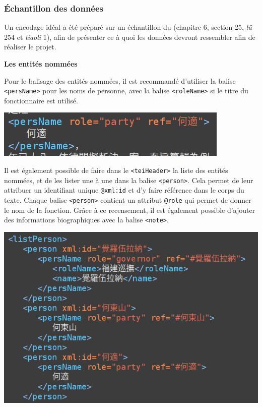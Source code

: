 \subsubsection{Échantillon des données}
Un encodage \TEI idéal a été préparé sur un échantillon du \dc (chapitre 6, section 25, \textit{lü} 254 et \textit{tiaoli} 1), afin de présenter ce à quoi les données devront ressembler afin de réaliser le projet. 

\bigskip
\textbf{Les entités nommées}

Pour le balisage des entités nommées, il est recommandé d’utiliser la balise \texttt{<persName>} pour les noms de personne, avec la balise \texttt{<roleName>} si le titre du fonctionnaire est utilisé. 

\noindent \includegraphics[width=\textwidth]{images/annexe11.png}

Il est également possible de faire dans le \texttt{<teiHeader>} la liste des entités nommées, et de les lister une à une dans la balise \texttt{<person>}. Cela permet de leur attribuer un identifiant unique \texttt{@xml:id} et d’y faire référence dans le corps du texte. Chaque balise \texttt{<person>} contient un attribut \texttt{@role} qui permet de donner le nom de la fonction. Grâce à ce recensement, il est également possible d’ajouter des informations biographiques avec la balise \texttt{<note>}. 

\noindent \includegraphics[width=\textwidth]{images/annexe12.png}

